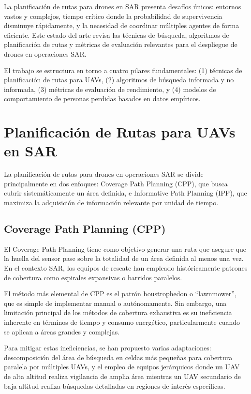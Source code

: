 \documentclass[12pt]{report} %
\begin{document}
La planificación de rutas para drones en SAR presenta desafíos únicos: entornos vastos y complejos, tiempo crítico donde la probabilidad de supervivencia disminuye rápidamente\cite{koester2008}, y la necesidad de coordinar múltiples agentes de forma eficiente. Este estado del arte revisa las técnicas de búsqueda, algoritmos de planificación de rutas y métricas de evaluación relevantes para el despliegue de drones en operaciones SAR.

El trabajo se estructura en torno a cuatro pilares fundamentales: (1) técnicas de planificación de rutas para UAVs, (2) algoritmos de búsqueda informada y no informada, (3) métricas de evaluación de rendimiento, y (4) modelos de comportamiento de personas perdidas basados en datos empíricos.

\chapter{Planificación de Rutas para UAVs en SAR}

La planificación de rutas para drones en operaciones SAR se divide principalmente en dos enfoques: Coverage Path Planning (CPP), que busca cubrir sistemáticamente un área definida, e Informative Path Planning (IPP), que maximiza la adquisición de información relevante por unidad de tiempo.

\section{Coverage Path Planning (CPP)}

El Coverage Path Planning tiene como objetivo generar una ruta que asegure que la huella del sensor pase sobre la totalidad de un área definida al menos una vez\cite{galceran2013}. En el contexto SAR, los equipos de rescate han empleado históricamente patrones de cobertura como espirales expansivas o barridos paralelos\cite{foo2012, hart2023}.

El método más elemental de CPP es el patrón boustrophedon o ``lawnmower'', que es simple de implementar manual o autónomamente\cite{bahnemann2019}. Sin embargo, una limitación principal de los métodos de cobertura exhaustiva es su ineficiencia inherente en términos de tiempo y consumo energético, particularmente cuando se aplican a áreas grandes y complejas\cite{choset2001}.

Para mitigar estas ineficiencias, se han propuesto varias adaptaciones: descomposición del área de búsqueda en celdas más pequeñas para cobertura paralela por múltiples UAVs\cite{nielsen2019, dong2020}, y el empleo de equipos jerárquicos donde un UAV de alta altitud realiza vigilancia de amplia área mientras un UAV secundario de baja altitud realiza búsquedas detalladas en regiones de interés específicas\cite{hacho2018}.
\end{document}
